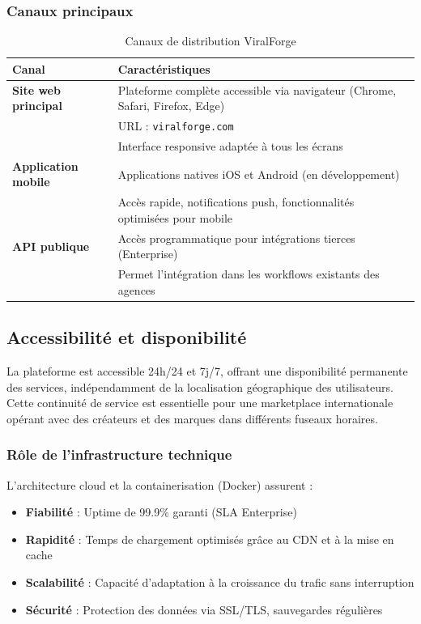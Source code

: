 \subsubsection{Canaux principaux}

\begin{table}[H]
\centering
\caption{Canaux de distribution ViralForge}
\label{tab:canaux-distribution}
\begin{tabular}{|l|p{10cm}|}
\hline
\textbf{Canal} & \textbf{Caractéristiques} \\
\hline
\textbf{Site web principal} & Plateforme complète accessible via navigateur (Chrome, Safari, Firefox, Edge) \\
    & URL : \texttt{viralforge.com} \\
    & Interface responsive adaptée à tous les écrans \\
\hline
\textbf{Application mobile} & Applications natives iOS et Android (en développement) \\
    & Accès rapide, notifications push, fonctionnalités optimisées pour mobile \\
\hline
\textbf{API publique} & Accès programmatique pour intégrations tierces (Enterprise) \\
    & Permet l'intégration dans les workflows existants des agences \\
\hline
\end{tabular}
\end{table}

\subsection{Accessibilité et disponibilité}

La plateforme est accessible 24h/24 et 7j/7, offrant une disponibilité permanente des services, indépendamment de la localisation géographique des utilisateurs. Cette continuité de service est essentielle pour une marketplace internationale opérant avec des créateurs et des marques dans différents fuseaux horaires.

\subsubsection{Rôle de l'infrastructure technique}

L'architecture cloud et la containerisation (Docker) assurent :
\begin{itemize}
    \item \textbf{Fiabilité} : Uptime de 99.9\% garanti (SLA Enterprise)
    \item \textbf{Rapidité} : Temps de chargement optimisés grâce au CDN et à la mise en cache
    \item \textbf{Scalabilité} : Capacité d'adaptation à la croissance du trafic sans interruption
    \item \textbf{Sécurité} : Protection des données via SSL/TLS, sauvegardes régulières
\end{itemize}

